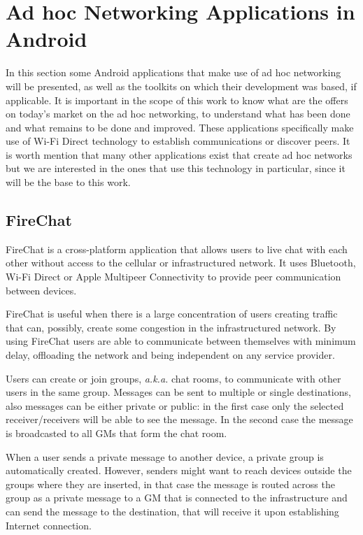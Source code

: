 \section{Ad hoc Networking Applications in Android}
\label{sec:apps}

In this section some Android applications that make use of ad hoc networking will be presented, as well as the toolkits on which their development was based, if applicable. It is important in the scope of this work to know what are the offers on today's market on the ad hoc networking, to understand what has been done and what remains to be done and improved. These applications specifically make use of Wi-Fi Direct technology to establish communications or discover peers. It is worth mention that many other applications exist that create ad hoc networks but we are interested in the ones that use this technology in particular, since it will be the base to this work.

\subsection{FireChat}

FireChat is a cross-platform application that allows users to live chat with each other without access to the cellular or infrastructured network. It uses Bluetooth, Wi-Fi Direct or Apple Multipeer Connectivity to provide peer communication between devices.

FireChat is useful when there is a large concentration of users creating traffic that can, possibly, create some congestion in the infrastructured network. By using FireChat users are able to communicate between themselves with minimum delay, offloading the network and being independent on any service provider.

Users can create or join groups, \textit{a.k.a.} chat rooms, to communicate with other users in the same group. Messages can be sent to multiple or single destinations, also messages can be either private or public: in the first case only the selected receiver/receivers will be able to see the message. In the second case the message is broadcasted to all \glspl{GM} that form the chat room.

When a user sends a private message to another device, a private group is automatically created. However, senders might want to reach devices outside the groups where they are inserted, in that case the message is routed across the group as a private message to a \gls{GM} that is connected to the infrastructure and can send the message to the destination, that will receive it upon establishing Internet connection.


